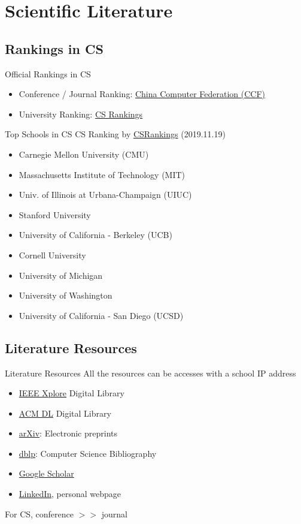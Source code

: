 \documentclass{../TexTemplate/myslide}
\begin{document}
\section{Scientific Literature}
\begin{frame}
\sectionpage
\end{frame}

\subsection{Rankings in CS}
\begin{frame}{Official Rankings in CS}
\begin{itemize}
	\item Conference / Journal Ranking: \href{https://www.ccf.org.cn/xspj/gyml/}{China Computer Federation (CCF)}
	\item University Ranking: \href{http://csrankings.org/\#/index?all}{CS Rankings}
\end{itemize}
\end{frame}

\begin{frame}{Top Schools in CS}
CS Ranking by \href{http://csrankings.org/\#/index?all}{CSRankings} (2019.11.19)
\begin{itemize}
	\item Carnegie Mellon University (CMU)
	\item Massachusetts Institute of Technology (MIT)
	\item Univ. of Illinois at Urbana-Champaign (UIUC)
	\item Stanford University
	\item University of California - Berkeley (UCB)
	\item Cornell University
	\item University of Michigan
	\item University of Washington
	\item University of California - San Diego (UCSD)
\end{itemize}
\end{frame}

\subsection{Literature Resources}
\begin{frame}{Literature Resources}
All the resources can be accesses with a school IP address
\begin{itemize}
	\item \href{https://ieeexplore.ieee.org/Xplore/home.jsp}{IEEE Xplore} Digital Library
	\item \href{https://dl.acm.org/}{ACM DL} Digital Library
	\item \href{https://arxiv.org/}{arXiv}: Electronic preprints
	\item \href{https://dblp.org/}{dblp}: Computer Science Bibliography
	\item \href{https://scholar.google.com/}{Google Scholar}
	\item \href{https://www.linkedin.com/}{LinkedIn}, personal webpage
\end{itemize}
For CS, conference $>>$ journal
\end{frame}
\end{document}
